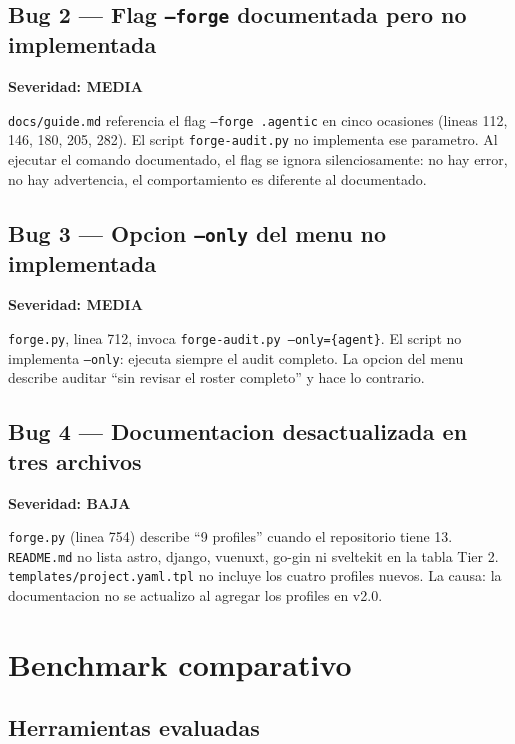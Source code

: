 \documentclass[12pt,a4paper]{article}
\begin{document}
\subsection{Bug 2 — Flag \texttt{--forge} documentada pero no implementada}

\textbf{\textcolor{warnorange}{Severidad: MEDIA}}

\texttt{docs/guide.md} referencia el flag \texttt{--forge .agentic} en cinco ocasiones
(lineas 112, 146, 180, 205, 282). El script \texttt{forge-audit.py} no implementa ese
parametro. Al ejecutar el comando documentado, el flag se ignora silenciosamente: no
hay error, no hay advertencia, el comportamiento es diferente al documentado.

\subsection{Bug 3 — Opcion \texttt{--only} del menu no implementada}

\textbf{\textcolor{warnorange}{Severidad: MEDIA}}

\texttt{forge.py}, linea 712, invoca \texttt{forge-audit.py --only=\{agent\}}.
El script no implementa \texttt{--only}: ejecuta siempre el audit completo. La opcion
del menu describe auditar ``sin revisar el roster completo'' y hace lo contrario.

\subsection{Bug 4 — Documentacion desactualizada en tres archivos}

\textbf{Severidad: BAJA}

\texttt{forge.py} (linea 754) describe ``9 profiles'' cuando el repositorio tiene 13.
\texttt{README.md} no lista astro, django, vuenuxt, go-gin ni sveltekit en la tabla
Tier 2. \texttt{templates/project.yaml.tpl} no incluye los cuatro profiles nuevos.
La causa: la documentacion no se actualizo al agregar los profiles en v2.0.

\section{Benchmark comparativo}

\subsection{Herramientas evaluadas}
\end{document}
